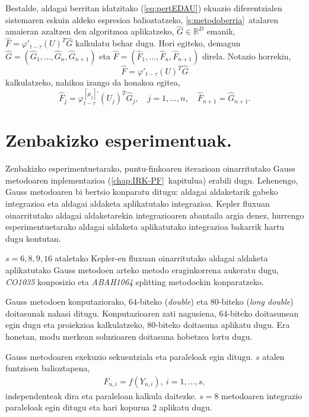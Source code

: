 Bestalde,  aldagai berritan idatzitako (\ref{eq:pertEDAU}) ekuazio diferentzialen sistemaren eskuin aldeko espresioa balioztatzeko, \ref{s:metodoberria}~atalaren amaieran azaltzen den algoritmoa aplikatzeko, $\widehat G \in \mathbb{R}^D$ emanik,  $\widehat F = \varphi'_{t-\tau}(U)^{T} \widehat G$ kalkulatu behar dugu.
Hori egiteko, demagun $\widehat G = (\widehat G_1,\ldots,\widehat G_n,\widehat G_{n+1})$ eta  $\widehat F = (\widehat F_1,\ldots,\widehat F_n,\widehat F_{n+1})$ direla. Notazio horrekin,
\begin{equation*}
\widehat F = \varphi'_{t-\tau}(U)^{T} \widehat G
\end{equation*}
 kalkulatzeko, nahikoa izango da honakoa egitea,
\begin{equation*}
\widehat F_j =  \varphi^{[\mu_{j}]'}_{t-\tau}(U_j)^{T} \widehat G_j, \quad j=1,\ldots,n, \quad \widehat F_{n+1} = \widehat G_{n+1}.
\end{equation*}



\section{Zenbakizko esperimentuak.}
\label{s:7espmt}

Zenbakizko esperimentuetarako, puntu-finkoaren iterazioan oinarritutako Gauss metodoaren inplementazioa (\ref{chap:IRK-PF}~kapitulua) erabili dugu. Lehenengo, Gauss metodoaren bi bertsio konparatu ditugu: aldagai aldaketarik gabeko integrazioa eta aldagai aldaketa aplikatutako integrazioa. Kepler fluxuan oinarritutako aldagai aldaketarekin integrazioaren abantaila argia denez, hurrengo esperimentuetarako aldagai aldaketa aplikatutako integrazioa bakarrik hartu dugu kontutan.  
 
$s=6,8,9,16$ ataletako Kepler-en fluxuan oinarritutako aldagai aldaketa aplikatutako Gauss metodoen arteko metodo eraginkorrena aukeratu dugu, \emph{CO1035} konposizio eta \emph{ABAH1064} splitting  metodoekin konparatzeko.

Gauss metodoen konputaziorako, $64$-biteko (\emph{double}) eta $80$-biteko (\emph{long double}) doitasunak nahasi ditugu. Konputazioaren zati nagusiena, $64$-biteko doitasunean egin dugu eta proiekzioa kalkulatzeko, $80$-biteko doitasuna aplikatu dugu. Era honetan, modu merkean soluzioaren doitasuna hobetzea lortu dugu.

Gauss metodoaren exekuzio sekuentziala eta paraleloak egin ditugu. $s$ atalen funtzioen balioztapena, 
\begin{align*}
F_{n,i}=f(Y_{n,i}), \ i=1,\dots,s,
\end{align*}      
independenteak dira eta paraleloan kalkula daitezke. $s=8$ metodoaren integrazio paraleloak egin ditugu eta hari kopurua $2$ aplikatu dugu. 

